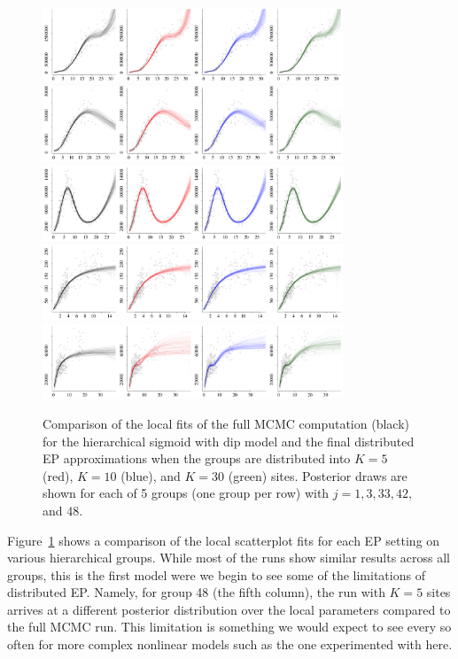 \begin{figure}
\centering
    \includegraphics[width=0.8\textwidth]{figures/ep_sim/sigmoid_dip_fit_1.png}
     \includegraphics[width=0.8\textwidth]{figures/ep_sim/sigmoid_dip_fit_2.png}
     \includegraphics[width=0.8\textwidth]{figures/ep_sim/sigmoid_dip_fit_3.png}
     \includegraphics[width=0.8\textwidth]{figures/ep_sim/sigmoid_dip_fit_4.png}
     \includegraphics[width=0.8\textwidth]{figures/ep_sim/sigmoid_dip_fit_5.png}
\caption{Comparison of the local fits of the full MCMC computation (black) for the hierarchical sigmoid with dip model and the final distributed EP approximations when the groups are distributed into $K=5$ (red), $K=10$ (blue), and $K=30$ (green) sites. Posterior draws are shown for each of 5 groups (one group per row) with $j = 1, 3, 33, 42,$ and $48$.}
\label{fig:ep_results_sigmoid_dip}
\end{figure}

Figure~\ref{fig:ep_results_sigmoid_dip} shows a comparison of the local scatterplot fits for each EP setting on various hierarchical groups. While most of the runs show similar results across all groups, this is the first model were we begin to see some of the limitations of distributed EP. Namely, for group 48 (the fifth column), the run with $K = 5$ sites arrives at a different posterior distribution over the local parameters compared to the full MCMC run. This limitation is something we would expect to see every so often for more complex nonlinear models such as the one experimented with here.

